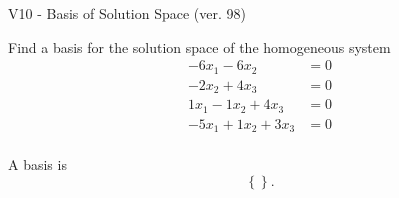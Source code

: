 \begin{exercise}
  \begin{exerciseTitle}V10 - Basis of Solution Space (ver. 98)\end{exerciseTitle}
  \begin{exerciseStatement}
    Find a basis for the solution space of the homogeneous system 
\begin{align*}
 -6 x_ 1 -6 x_ 2 &= 0  \\ 
  -2 x_ 2 + 4 x_ 3 &= 0  \\ 
  1 x_ 1 -1 x_ 2 + 4 x_ 3 &= 0  \\ 
  -5 x_ 1 + 1 x_ 2 + 3 x_ 3 &= 0  \\ 
 \end{align*}


 
  \end{exerciseStatement}

  \begin{exerciseAnswer}
   A basis is   
\[\left\{\right\}.\]

  


  \end{exerciseAnswer}
\end{exercise}